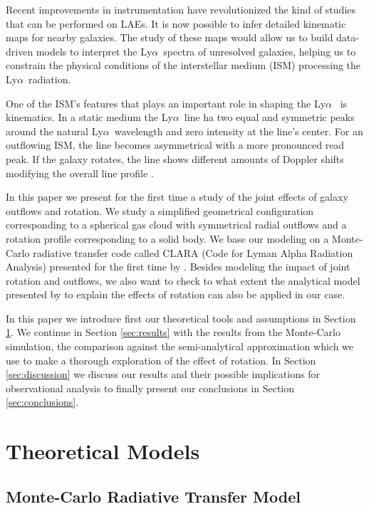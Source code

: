 \documentclass[a4paper,fleqn,usenatbib]{mnras}
\newcommand{\HI}{{\text{H\MakeUppercase{\romannumeral 1}}} }
\newcommand{\lya}{\ifmmode{{\rm Ly}\alpha}\else Ly$\alpha$\ \fi}
\begin{document}
Recent improvements in instrumentation have revolutionized the kind of
studies that can be performed on LAEs.  
It is now possible to infer detailed kinematic maps for nearby galaxies.
The study of these maps would allow us to build data-driven models to
interpret the \lya spectra of unresolved galaxies, helping us to
constrain the physical conditions of the interstellar medium (ISM)
processing the \lya radiation.

One of the ISM's features that plays an important role in shaping the \lya
is \HI kinematics. 
In a static \HI medium the \lya line ha  two equal and symmetric peaks
around the natural \lya wavelength and zero intensity at the line's
center.
For an outflowing ISM, the line becomes
asymmetrical with a more pronounced read peak.
If the galaxy rotates, the line shows different amounts of Doppler
shifts modifying the overall line profile \citep{Garavito14}.

In this paper we present for the first time a study of the joint
effects of galaxy outflows and rotation.
We study a simplified geometrical configuration corresponding to a
spherical gas cloud with symmetrical radial outflows and a rotation
profile corresponding to a solid body.
We base our modeling on a Monte-Carlo radiative transfer code called
CLARA (Code for Lyman Alpha Radiation Analysis) presented for the
first time by \cite{CLARA}.
Besides modeling the impact of joint rotation and outflows, we also
want to check to what extent the analytical model presented by
\cite{Garavito14} to explain the effects of rotation can also be
applied in our case.

In this paper we introduce first our theoretical tools and assumptions
in Section \ref{sec:theory}. We continue in Section  \ref{sec:results}
with the results from the Monte-Carlo simulation, the comparison
against the semi-analytical approximation which we use to make a
thorough exploration of the effect of rotation.
In Section \ref{sec:discussion} we discuss our results and their
possible implications for observational analysis to finally present
our conclusions in Section \ref{sec:conclusions}.


\section{Theoretical Models}
\label{sec:theory}

\subsection{Monte-Carlo Radiative Transfer Model}
\end{document}
